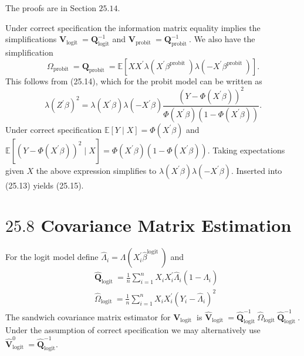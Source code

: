 \documentclass[10pt]{article}
\begin{document}
The proofs are in Section $25.14$.

Under correct specification the information matrix equality implies the simplifications $\boldsymbol{V}_{\text {logit }}=\boldsymbol{Q}_{\operatorname{logit}}^{-1}$ and $\boldsymbol{V}_{\text {probit }}=\boldsymbol{Q}_{\text {probit }}^{-1}$. We also have the simplification
$$
\Omega_{\text {probit }}=\boldsymbol{Q}_{\text {probit }}=\mathbb{E}\left[X X^{\prime} \lambda\left(X^{\prime} \beta^{\text {probit }}\right) \lambda\left(-X^{\prime} \beta^{\text {probit }}\right)\right] .
$$
This follows from (25.14), which for the probit model can be written as
$$
\lambda\left(Z^{\prime} \beta\right)^{2}=\lambda\left(X^{\prime} \beta\right) \lambda\left(-X^{\prime} \beta\right) \frac{\left(Y-\Phi\left(X^{\prime} \beta\right)\right)^{2}}{\Phi\left(X^{\prime} \beta\right)\left(1-\Phi\left(X^{\prime} \beta\right)\right)} .
$$
Under correct specification $\mathbb{E}[Y \mid X]=\Phi\left(X^{\prime} \beta\right)$ and $\mathbb{E}\left[\left(Y-\Phi\left(X^{\prime} \beta\right)\right)^{2} \mid X\right]=\Phi\left(X^{\prime} \beta\right)\left(1-\Phi\left(X^{\prime} \beta\right)\right)$. Taking expectations given $X$ the above expression simplifies to $\lambda\left(X^{\prime} \beta\right) \lambda\left(-X^{\prime} \beta\right)$. Inserted into (25.13) yields (25.15).

\section{$25.8$ Covariance Matrix Estimation}
For the logit model define $\widehat{\Lambda}_{i}=\Lambda\left(X_{i}^{\prime} \widehat{\beta}^{\text {logit }}\right)$ and
$$
\begin{aligned}
&\widehat{\boldsymbol{Q}}_{\text {logit }}=\frac{1}{n} \sum_{i=1}^{n} X_{i} X_{i}^{\prime} \widehat{\Lambda}_{i}\left(1-\widehat{\Lambda}_{i}\right) \\
&\widehat{\Omega}_{\text {logit }}=\frac{1}{n} \sum_{i=1}^{n} X_{i} X_{i}^{\prime}\left(Y_{i}-\widehat{\Lambda}_{i}\right)^{2}
\end{aligned}
$$
The sandwich covariance matrix estimator for $\boldsymbol{V}_{\text {logit }}$ is $\widehat{\boldsymbol{V}}_{\text {logit }}=\widehat{\boldsymbol{Q}}_{\text {logit }}^{-1} \widehat{\Omega}_{\text {logit }} \widehat{\boldsymbol{Q}}_{\text {logit }}^{-1}$. Under the assumption of correct specification we may alternatively use $\widehat{\boldsymbol{V}}_{\text {logit }}^{0}=\widehat{\boldsymbol{Q}}_{\operatorname{logit}}^{-1}$.
\end{document}
